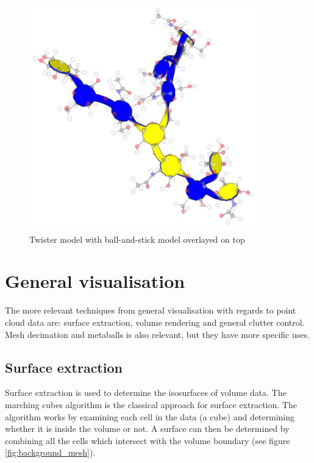 \begin{figure}[h!]
  \begin{center}
    \includegraphics[width=100mm]{twister}
  \end{center}
  \caption{Twister model with ball-and-stick model overlayed on top}
  \label{fig:background_twister}
\end{figure}



\section{General visualisation}
\label{sec:background_general}


The more relevant techniques from general visualisation with regards to point
cloud data are: surface extraction, volume rendering and general clutter
control. Mesh decimation and metaballs is also relevant, but they have more
specific uses.


\subsection{Surface extraction}
\label{sub:background_surface}

Surface extraction is used to determine the isosurfaces of volume data. The
marching cubes algorithm \citep{lorensen87} is the classical approach for
surface extraction. The algorithm works by examining each cell in the data (a
cube) and determining whether it is inside the volume or not. A surface can
then be determined by combining all the cells which intersect with the volume
boundary (see figure \ref{fig:background_mesh}).

